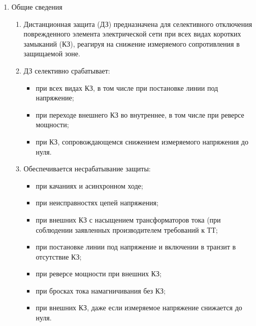 
\color{black}

\begin{enumerate}[label=\arabic{section}.\arabic{subsection}.\arabic{enumi}, labelsep=4pt, leftmargin=0pt, itemindent=57pt, itemsep=0pt, parsep=5pt] %
\item Общие сведения

\begin{enumerate}[label=\arabic{section}.\arabic{subsection}.\arabic{enumi}.\arabic*, labelsep=4pt, leftmargin=0em, itemindent=65pt, parsep=0pt]

\item
Дистанционная  защита  (ДЗ)  предназначена  для  селективного  отключения  поврежденного  элемента электрической  сети  при  всех видах  коротких  замыканий (КЗ),  реагируя  на снижение измеряемого сопротивления в защищаемой зоне.

\item 
ДЗ селективно срабатывает:
\begin{itemize}
    \item при всех видах КЗ, в том числе при постановке линии под напряжение; 
    \item при переходе внешнего КЗ во внутреннее, в том числе при реверсе мощности; 
    \item при КЗ, сопровождающемся снижением измеряемого напряжения до нуля.
\end{itemize}

\item 
Обеспечивается несрабатывание защиты:
\begin{itemize} 
\item при качаниях и асинхронном ходе; 
\item при неисправностях цепей напряжения;
\item при внешних КЗ с насыщением трансформаторов тока (при соблюдении заявленных производителем требований к ТТ; 
\item при постановке линии под напряжение и включении в транзит в отсутствие КЗ;
\item при реверсе мощности при внешних КЗ; 
\item при бросках тока намагничивания без КЗ;
\item при внешних КЗ, даже если измеряемое напряжение снижается до нуля.
\end{itemize}


\end{enumerate}
\end{enumerate}
